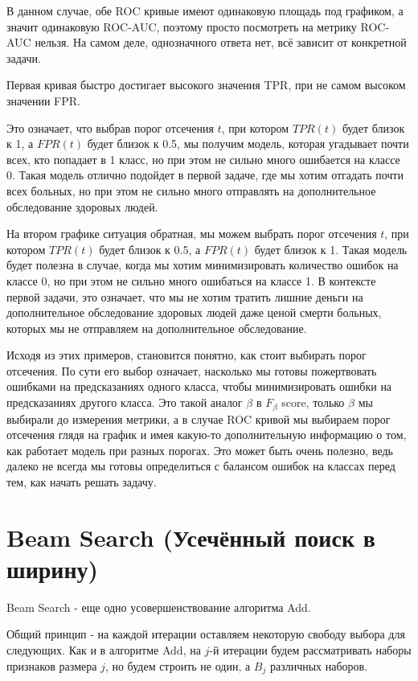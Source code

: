 \begin{solution}
В данном случае, обе ROC кривые имеют одинаковую площадь под графиком, а значит одинаковую ROC-AUC, поэтому просто посмотреть на метрику ROC-AUC нельзя.
На самом деле, однозначного ответа нет, всё зависит от конкретной задачи.

Первая кривая быстро достигает высокого значения TPR, при не самом высоком значении FPR.

Это означает, что выбрав порог отсечения $t$, при котором $TPR(t)$ будет близок к 1, а $FPR(t)$ будет близок к 0.5, мы получим модель,
которая угадывает почти всех, кто попадает в 1 класс, но при этом не сильно много ошибается на классе 0.
Такая модель отлично подойдет в первой задаче, где мы хотим отгадать почти всех больных, но при этом не сильно много отправлять на дополнительное обследование здоровых людей.

На втором графике ситуация обратная, мы можем выбрать порог отсечения $t$, при котором $TPR(t)$ будет близок к 0.5, а $FPR(t)$ будет близок к 1.
Такая модель будет полезна в случае, когда мы хотим минимизировать количество ошибок на классе 0, но при этом не сильно много ошибаться на классе 1.
В контексте первой задачи, это означает, что мы не хотим тратить лишние деньги на дополнительное обследование здоровых людей даже ценой смерти больных, которых мы не отправляем на дополнительное обследование.

Исходя из этих примеров, становится понятно, как стоит выбирать порог отсечения. По сути его выбор означает, насколько мы готовы пожертвовать ошибками на предсказаниях одного класса, чтобы минимизировать ошибки на предсказаниях другого класса.
Это такой аналог $\beta$ в $F_{\beta}$ score, только $\beta$ мы выбирали до измерения метрики, а в случае ROC кривой мы выбираем порог отсечения глядя на график и имея какую-то дополнительную информацию о том, как работает модель при разных порогах.
Это может быть очень полезно, ведь далеко не всегда мы готовы определиться с балансом ошибок на классах перед тем, как начать решать задачу.
\end{solution}

\section{Beam Search (Усечённый поиск в ширину)}
Beam Search - еще одно усовершенствование алгоритма Add.

Общий принцип - на каждой итерации оставляем некоторую свободу выбора для следующих.
Как и в алгоритме Add, на $j$-й итерации будем рассматривать наборы признаков размера $j$, но будем строить не один, а $B_j$ различных наборов.

